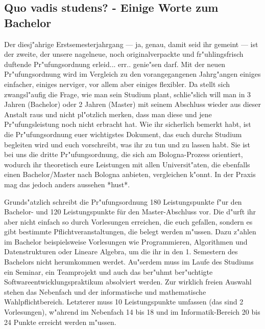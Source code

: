 \subsection{Quo vadis studens? - Einige Worte zum Bachelor}

Der diesj"ahrige Erstsemesterjahrgang --- ja, genau, damit seid ihr gemeint --- ist der zweite, der unsere
nagelneue, noch originalverpackte und fr"uhlingsfrisch duftende Pr"ufungsordnung erleid... err..
genie"sen darf. Mit der neuen Pr"ufungsordnung wird im Vergleich zu den vorangegangenen
Jahrg"angen einiges einfacher, einiges nerviger, vor allem aber einiges flexibler. Da stellt sich
zwangsl"aufig die Frage, wie man sein Studium plant, schlie"slich will
man in 3 Jahren (Bachelor) oder 2 Jahren (Master) mit seinem
Abschluss wieder aus dieser Anstalt raus und nicht pl"otzlich merken, dass man diese und jene
Pr"ufungsleistung noch nicht erbracht hat.
Wie ihr sicherlich bemerkt habt, ist die Pr"ufungsordnung euer wichtigstes Dokument, das euch
durchs Studium begleiten wird und euch vorschreibt, was ihr zu tun und zu lassen habt. Sie ist bei
uns die dritte Pr"ufungsordnung, die sich am Bologna-Prozess orientiert, wodurch ihr theoretisch
eure Leistungen mit allen Universit"aten, die ebenfalls einen Bachelor/Master nach Bologna
anbieten, vergleichen k"onnt. In der Praxis mag das jedoch anders aussehen *hust*.

Grunds"atzlich schreibt die Pr"ufungsordnung 180 Leistungspunkte f"ur
den Bachelor- und 120 Leistungspunkte für den Master-Abschluss vor.
Die d"urft ihr aber nicht einfach so durch Vorlesungen erreichen, die euch gefallen, sondern es gibt
bestimmte Pflichtveranstaltungen, die belegt werden m"ussen. Dazu
z"ahlen im Bachelor beispielsweise Vorlesungen wie Programmieren, Algorithmen und Datenstrukturen oder Lineare Algebra, um die
ihr in den 1. Semestern des Bachelors nicht herumkommen werdet. Au"serdem muss im Laufe des Studiums ein Seminar, ein
Teamprojekt und auch das ber"uhmt ber"uchtigte Softwareentwicklungspraktikum absolviert werden.
Zur wirklich freien Auswahl stehen das Nebenfach und der informatische und mathematische
Wahlpflichtbereich. Letzterer muss 10 Leistungspunkte umfassen (das sind 2 Vorlesungen),
w"ahrend im Nebenfach 14 bis 18 und im Informatik-Bereich 20 bis 24 Punkte erreicht werden
m"ussen.

